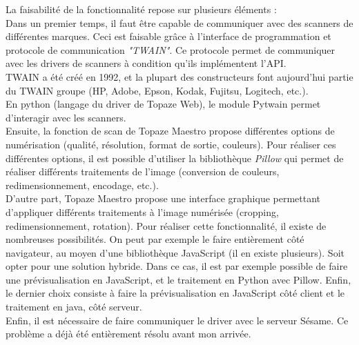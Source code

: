 La faisabilité de la fonctionnalité repose sur plusieurs éléments :\\
Dans un premier temps, il faut être capable de communiquer avec des scanners de différentes marques. Ceci est faisable grâce à l'interface de programmation et protocole de communication \textit{"TWAIN"}. Ce protocole permet de communiquer avec les drivers de  scanners à condition qu'ils implémentent l'API.\\
TWAIN a été créé en 1992\cite{bib:twain}, et la plupart des constructeurs font aujourd'hui partie du TWAIN groupe (HP, Adobe, Epson, Kodak, Fujitsu, Logitech, etc.).\\
En python (langage du driver de Topaze Web), le module Pytwain permet d'interagir avec les scanners.\\

Ensuite, la fonction de scan de Topaze Maestro propose différentes options de numérisation (qualité, résolution, format de sortie, couleurs). Pour réaliser ces différentes options, il est possible d'utiliser la bibliothèque \textit{Pillow} qui permet de réaliser différents traitements de l'image (conversion de couleurs, redimensionnement, encodage, etc.)\cite{bib:pillow}.\\

D'autre part, Topaze Maestro propose une interface graphique permettant d'appliquer différents traitements à l'image numérisée (cropping, redimensionnement, rotation). 
Pour réaliser cette fonctionnalité, il existe de nombreuses possibilités. On peut par exemple le faire entièrement côté navigateur, au moyen d'une bibliothèque JavaScript (il en existe plusieurs). Soit opter pour une solution hybride. Dans ce cas, il est par exemple possible de faire une prévisualisation en JavaScript, et le traitement en Python avec Pillow. 
Enfin, le dernier choix consiste à faire la prévisualisation en JavaScript côté client et le traitement en java, côté serveur. \\

Enfin, il est nécessaire de faire communiquer le driver avec le serveur Sésame. Ce problème a déjà été entièrement résolu avant mon arrivée.

